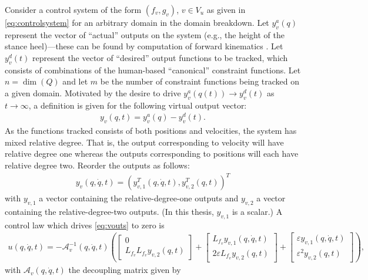 Consider a control system of the form $(f_{v},g_{v})$, $v \in V_{u}$ as given in
\eqref{eq:controlsystem} for an arbitrary domain in the domain breakdown.
%
Let $y^{a}_{v}(q)$ represent the vector of ``actual'' outputs on the system
(e.g., the height of the stance heel)---these can be found by computation of
forward kinematics \cite{Murray94}.
%
Let $y^{d}_{v}(t)$ represent the vector of ``desired'' output functions to be
tracked, which consists of combinations of the human-based ``canonical''
constraint functions.
%
Let $n = \dim(Q)$ and let $m$ be the number of constraint functions being
tracked on a given domain.
%
Motivated by the desire to drive $y^{a}_{v}(q(t)) \to y^{d}_{v}(t)$ as $t \to
\infty$, a definition is given for the following virtual output vector:
%
\begin{align}
  \label{eq:virtout}
  y_v(q,t) = y^a_v(q) - y^d_v(t).
\end{align}
As the functions tracked consists of both positions and velocities, the system
has mixed relative degree.
%
That is, the output corresponding to velocity will have relative degree one
whereas the outputs corresponding to positions will each have relative degree
two.
%
Reorder the outputs as follows:
\begin{align}
  \label{eq:vouts}
  y_v(q, {\dot q}, t) = (y_{v,1}^T(q, {\dot q}, t),y_{v,2}^T(q, t))^T
\end{align}
with $y_{v,1}$ a vector containing the relative-degree-one outputs and $y_{v,2}$
a vector containing the relative-degree-two outputs.
%
(In this thesis, $y_{v,1}$ is a scalar.)
%
A control law which drives \eqref{eq:vouts} to zero is
\begin{align*}
  u(q, {\dot q}, t) = -\mathcal{A}_{v}^{-1}(q, {\dot q}, t)
  \left(\left[\!\!\begin{array}{c}
      0\\
      L_{f_{v}} L_{f_{v}} y_{v,2}(q, t)
    \end{array}\!\!\right]
  + \left[\!\!\begin{array}{c}
      L_{f_{v}} y_{v,1}(q, {\dot q}, t)\\
      2 \varepsilon L_{f_{v}} y_{v,2}(q, t)
    \end{array}\!\!\right] +
  \left[\!\!\begin{array}{c}
      \varepsilon y_{v,1}(q, {\dot q}, t)\\
      \varepsilon^2 y_{v,2}(q, t)
    \end{array}\!\!\right]\right),
\end{align*}
with $\mathcal{A}_{v}(q, {\dot q},t)$ the decoupling matrix given by
